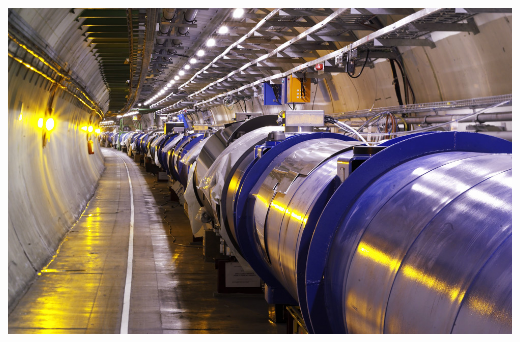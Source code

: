 \documentclass{beamer}
\begin{document}
\begin{frame}
\begin{columns}
\begin{column}{0.4\textwidth}
            \includegraphics[width=\textwidth]{figures/lhc2.jpg}
        \end{column}
    \end{columns}


\end{frame}
\end{document}
